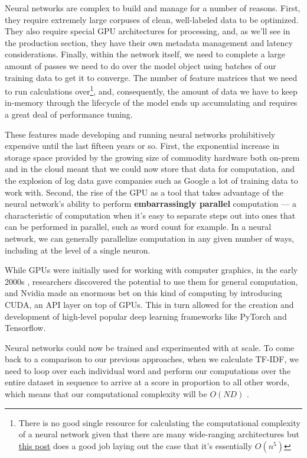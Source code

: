 \documentclass[11pt, table]{diazessay} %
\begin{document}
\begin{sloppypar}
Neural networks are complex to build and manage for a number of reasons. First, they require extremely large corpuses of clean, well-labeled data to be optimized. They also require special GPU architectures for processing, and, as we'll see in the production section, they have their own metadata management and latency considerations. Finally, within the network itself, we need to complete a large amount of passes we need to do over the model object using batches of our training data to get it to converge. The number of feature matrices that we need to run calculations over\footnote{There is no good single resource for calculating the computational complexity of a neural network given that there are many wide-ranging architectures but   \href{https://lunalux.io/computational-complexity-of-neural-networks/}{this post} does a good job laying out the case that it's essentially $O(n^5)$}, and, consequently, the amount of data we have to keep in-memory through the lifecycle of the model ends up accumulating and requires a great deal of performance tuning.

These features made developing and running neural networks prohibitively expensive until the last fifteen years or so. First, the exponential increase in storage space provided by the growing size of commodity hardware both on-prem and in the cloud meant that we could now store that data for computation, and  the explosion of log data gave companies such as Google a lot of training data to work with.  Second,  the rise of the GPU as a tool that takes advantage of the neural network's ability to perform \textbf{embarrassingly parallel} computation --- a characteristic of computation when it's easy to separate steps out into ones that can be performed in parallel, such as word count for example. In a neural network, we can generally parallelize computation in any given number of ways, including at the level of a single neuron.  

While GPUs were initially used for working with computer graphics, in the early 2000s \citep{oancea2014gpgpu}, researchers discovered the potential to use them for general computation, and Nvidia made an enormous bet on this kind of computing by introducing CUDA, an API layer on top of GPUs. This in turn allowed for the creation and development of high-level popular deep learning frameworks like PyTorch and Tensorflow.

Neural networks could now be trained and experimented with at scale. To come back to a comparison to our previous approaches, when we calculate TF-IDF, we need to loop over each individual word and perform our computations over the entire dataset in sequence to arrive at a score in proportion to all other words, which means that our computational complexity will be $O(N D)$ \citep{cong2016novel}.  


\end{sloppypar}
\end{document}
